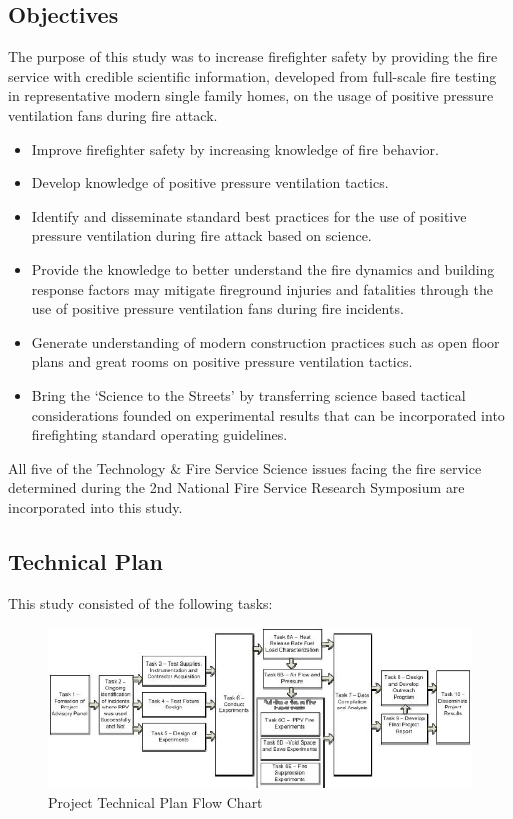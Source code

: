 \documentclass{article}
\begin{document}
\subsection {Objectives}

The purpose of this study was to increase firefighter safety by providing the fire service with credible scientific information, developed from full-scale fire testing in representative modern single family homes, on the usage of positive pressure ventilation fans during fire attack.

\begin{itemize}
	\item Improve firefighter safety by increasing knowledge of fire behavior.
	\item Develop knowledge of positive pressure ventilation tactics.
	\item Identify and disseminate standard best practices for the use of positive pressure ventilation during fire attack based on science.
	\item Provide the knowledge to better understand the fire dynamics and building response factors may mitigate fireground injuries and fatalities through the use of positive pressure ventilation fans during fire incidents.
	\item Generate understanding of modern construction practices such as open floor plans and great rooms on positive pressure ventilation tactics.
	\item Bring the ‘Science to the Streets’ by transferring science based tactical considerations founded on experimental results that can be incorporated into firefighting standard operating guidelines.
\end{itemize}

All five of the Technology \& Fire Service Science issues facing the fire service determined during the 2nd National Fire Service Research Symposium \cite{NFFF} are incorporated into this study.

\subsection{Technical Plan}

This study consisted of the following tasks:

\begin{figure}[H]
	\centering
	\includegraphics[width = 6in]{0_Images/Objectives_and_Technical_Plan/DHS2012_TechnicalPlan_FlowChart.jpg}
	\caption{Project Technical Plan Flow Chart}
	\label{fig:TechPlanChart}
\end{figure}
\end{document}
